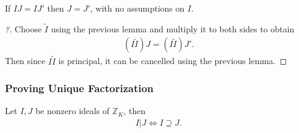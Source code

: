 \begin{proposition}

If \(IJ = IJ'\) then \(J = J'\), with no assumptions on \(I\).

\end{proposition}

\begin{proof}[?]

Choose \(\tilde I\) using the previous lemma and multiply it to both
sides to obtain
\begin{align*}
(I \tilde I) J = (I \tilde I) J'
.\end{align*}
Then since \(I\tilde I\) is principal, it can be cancelled using the
previous lemma.

\end{proof}

\hypertarget{proving-unique-factorization}{%
\subsubsection{Proving Unique
Factorization}\label{proving-unique-factorization}}

\begin{theorem}

Let \(I, J\) be nonzero ideals of \({\mathbb{Z}}_K\), then
\begin{align*}
I \mathrel{\Big|}J \iff I \supseteq J
.\end{align*}

\end{theorem}

